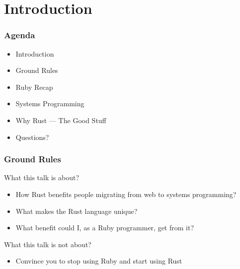 \section{Introduction}
\label{sec:introduction}

\begin{frame}
  \frametitle{Agenda}
  \begin{itemize}
  \item Introduction
  \item Ground Rules
  \item Ruby Recap
  \item Systems Programming
  \item Why Rust --- The Good Stuff
  \item Questions?
  \end{itemize}
\end{frame}

\begin{frame}
  \frametitle{Ground Rules}
  What this talk is about?
  \begin{itemize}
  \item How Rust benefits people migrating from web to systems programming?
  \item What makes the Rust language unique?
  \item What benefit could I, as a Ruby programmer, get from it?
  \end{itemize}
  What this talk is not about?
  \begin{itemize}
  \item Convince you to stop using Ruby and start using Rust
  \end{itemize}
\end{frame}
